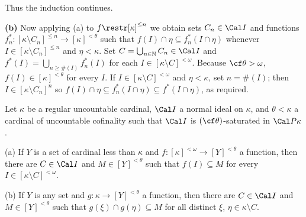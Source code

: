 {\noindent Thus the induction continues.\ \Qed

\medskip

{\bf (b)} Now applying (a) to $f\restr[\kappa]^{\le n}$
we obtain sets $C_n\in\Cal I$ and functions
$f^*_n:[\kappa\setminus C_n]^{\le n}\to[\kappa]^{<\theta}$ such that
$f(I)\cap\eta\subseteq f_n^*(I\cap\eta)$
whenever $I\in[\kappa\setminus C_n]^{\le n}$ and $\eta<\kappa$.   Set
$C=\bigcup_{n\in\Bbb N}C_n\in\Cal I$ and
$f^*(I)=\bigcup_{n\ge\#(I)}f^*_n(I)$ for each
$I\in[\kappa\setminus C]^{<\omega}$.   Because $\cf\theta>\omega$,
$f(I)\in[\kappa]^{<\theta}$ for every $I$.
If $I\in[\kappa\setminus C]^{<\omega}$ and
$\eta<\kappa$, set $n=\#(I)$;  then $I\in[\kappa\setminus C_n]^n$ so
$f(I)\cap\eta\subseteq f_n^*(I\cap\eta)\subseteq f^*(I\cap\eta)$, as
required.
}%

Let $\kappa$ be a regular uncountable cardinal, $\Cal I$ a normal
ideal on $\kappa$, and $\theta<\kappa$ a cardinal of uncountable
cofinality such that
$\Cal I$ is $(\cf\theta)$-saturated in $\Cal P\kappa$.

(a) If $Y$ is a set of
cardinal less than $\kappa$ and $f:[\kappa]^{<\omega}\to[Y]^{<\theta}$ a
function, then there are $C\in\Cal I$ and $M\in[Y]^{<\theta}$ such
that $f(I)\subseteq M$ for every $I\in[\kappa\setminus C]^{<\omega}$.

(b) If $Y$ is any set and $g:\kappa\to[Y]^{<\theta}$ a function, then there
are $C\in\Cal I$ and $M\in[Y]^{<\theta}$ such that
$g(\xi)\cap g(\eta)\subseteq M$ for all distinct $\xi$,
$\eta\in\kappa\setminus C$.


